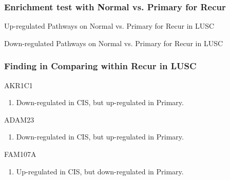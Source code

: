 \documentclass{beamer}
\begin{document}
    \begin{frame}
        \frametitle{Enrichment test with Normal vs. Primary for Recur}

        \begin{table}
            \caption{Up-regulated Pathways on Normal vs. Primary for Recur in LUSC}
            \resizebox{\linewidth}{!}
            {}
        \end{table}

        \begin{table}
            \caption{Down-regulated Pathways on Normal vs. Primary for Recur in LUSC}
            \resizebox{\linewidth}{!}
            {}
        \end{table}
    \end{frame}

    \begin{frame}[allowframebreaks]
        \frametitle{Finding in Comparing within Recur in LUSC}

        \begin{block}{AKR1C1}
            \begin{enumerate}
                \item Down-regulated in CIS, but up-regulated in Primary.
            \end{enumerate}
        \end{block}

        \begin{block}{ADAM23}
            \begin{enumerate}
                \item Down-regulated in CIS, but up-regulated in Primary.
            \end{enumerate}
        \end{block}

        \begin{block}{FAM107A}
            \begin{enumerate}
                \item Up-regulated in CIS, but down-regulated in Primary.
            \end{enumerate}
        \end{block}
    \end{frame}
\end{document}
